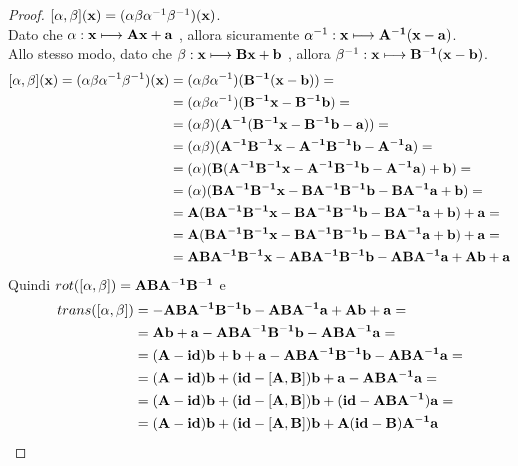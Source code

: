 \documentclass[a4paper,11pt,openright,twoside	]{book}
\begin{document}
\begin{proof}
	$ [ \alpha, \beta ](\vb{x}) = ( \alpha \beta \alpha^{-1} \beta^{-1} ) (\vb{x})$. \\
	Dato che $ \alpha : \vb{x} \longmapsto \vb{Ax + a}$ , allora sicuramente  $\alpha^{-1}: \vb{x} \longmapsto \vb{A^{-1}(x-a)}$.  \\
	Allo stesso modo, dato che $ \beta : \vb{x} \longmapsto \vb{Bx + b}$ , allora $\beta^{-1}: \vb{x} \longmapsto \vb{B^{-1}(x-b)}$. 
\begin{equation*}
\begin{split}
[ \alpha, \beta ](\vb{x}) = (\alpha \beta \alpha^{-1} \beta^{-1} ) (\vb{x})
& = (\alpha \beta \alpha^{-1})( \vb{B^{-1}(x-b)}) = \\ 
& = (\alpha \beta \alpha^{-1})( \vb{B^{-1}x- B^{-1}b }) = \\ 
& = (\alpha \beta)(\vb{A^{-1}( B^{-1}x- B^{-1}b -a)})= \\
& =  (\alpha \beta)(\vb{A^{-1} B^{-1}x- A^{-1}B^{-1}b -A^{-1}a})  = \\
& = (\alpha)(\vb{B(A^{-1} B^{-1}x- A^{-1}B^{-1}b -A^{-1}a) +b}) = \\
& = (\alpha)(\vb{BA^{-1} B^{-1}x-BA^{-1}B^{-1}b -BA^{-1}a +b}) = \\
& = \vb{A(BA^{-1} B^{-1}x-BA^{-1}B^{-1}b -BA^{-1}a +b) + a} = \\
& = \vb{A(BA^{-1} B^{-1}x-BA^{-1}B^{-1}b -BA^{-1}a +b) + a} = \\
& = \vb{ABA^{-1} B^{-1}x-ABA^{-1}B^{-1}b -ABA^{-1}a +Ab + a }
\end{split}
\end{equation*}
Quindi $ rot([ \alpha , \beta ]) = \vb{ABA^{-1} B^{-1} }$ e
\begin{equation*}
\begin{split}
trans([ \alpha, \beta ]) & = \vb{-ABA^{-1}B^{-1}b -ABA^{-1}a +Ab + a }= \\
& = \vb{Ab + a -ABA^{-1}B^{-1}b -ABA^{-1}a }= \\
& = \vb{(A-id)b + b + a -ABA^{-1}B^{-1}b -ABA^{-1}a} = \\
& = \vb{(A-id)b + (id-[A,B])b + a - ABA^{-1}a} = \\
& = \vb{(A-id)b + (id-[A,B])b + (id- ABA^{-1})a }= \\
& = \vb{(A-id)b + (id-[A,B])b + A(id- B)A^{-1}a} 
\end{split}
\end{equation*}	
\end{proof}
\end{document}
